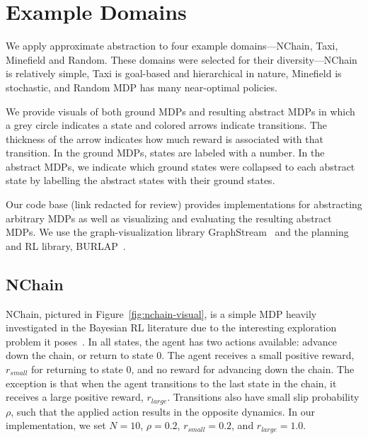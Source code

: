 \section{Example Domains}
We apply approximate abstraction to four example domains---NChain, Taxi, Minefield and Random. These domains were selected for their diversity---NChain is relatively simple, Taxi is goal-based and hierarchical in nature, Minefield is stochastic, and Random MDP has many near-optimal policies.

We provide visuals of both ground \acp{MDP} and resulting abstract \acp{MDP} in which a grey circle indicates a state and colored arrows indicate transitions. The thickness of the arrow indicates how much reward is associated with that transition. In the ground \acp{MDP}, states are labeled with a number. In the abstract \acp{MDP}, we indicate which ground states were collapsed to each abstract state by labelling the abstract states with their ground states. %

Our code base (link redacted for review) provides implementations for abstracting arbitrary \acp{MDP} as well as visualizing and evaluating the resulting abstract \acp{MDP}. We use the graph-visualization library GraphStream~\cite{graphstream} and the planning and \ac{RL} library, BURLAP~\cite{BURLAPCITATION}.

\subsection{NChain}

NChain, pictured in Figure~\ref{fig:nchain-visual}, is a simple MDP heavily investigated in the Bayesian RL literature due to the interesting exploration problem it poses~\cite{dearden1998bayesian}. In all states, the agent has two actions available: advance down the chain, or return to state 0. The agent receives a small positive reward, $r_{small}$ for returning to state 0, and no reward for advancing down the chain. The exception is that when the agent transitions to the last state in the chain, it receives a large positive reward, $r_{large}$. Transitions also have small slip probability $\rho$, such that the applied action results in the opposite dynamics. In our implementation, we set $N=10$, $\rho=0.2$, $r_{small} = 0.2$, and $r_{large} = 1.0$.

